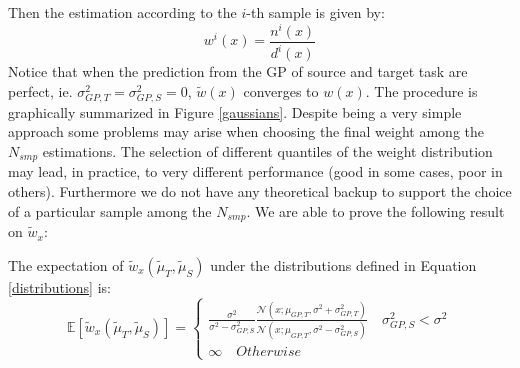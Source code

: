     Then the estimation according to the $i$-th sample is given by:
    \begin{equation}
      w^{i}(x) = \frac{n^{i}(x)}{d^{i}(x)}
    \end{equation}
    Notice that when the prediction from the GP of source and target task are perfect, ie. $\sigma_{GP,T}^{2} = \sigma_{GP,S}^{2} = 0$,
    $\tilde{w}(x)$ converges to $w(x)$.
    The procedure is graphically summarized in Figure \ref{gaussians}.\newline
    Despite being a very simple approach some problems may arise when choosing the final weight among the $N_{smp}$ estimations.
    The selection of different quantiles of the weight distribution may lead, in practice, to very different performance (good in some cases, poor in others). Furthermore
    we do not have any theoretical backup to support the choice of a particular sample among the $N_{smp}$.\newline
    We are able to prove the following result on $\tilde{w}_{x}$:
    \begin{lemma}
      The expectation of $\tilde{w}_{x}(\tilde{\mu}_{T}, \tilde{\mu}_{S})$ under the distributions defined in
      Equation \ref{distributions} is:
      \begin{equation}
        \mathbb{E}[\tilde{w}_{x}(\tilde{\mu}_{T}, \tilde{\mu}_{S})] =
        \begin{cases}
          \frac{\sigma^{2}}{\sigma^{2} - \sigma^{2}_{GP,S}} \frac{\mathcal{N}(x; \mu_{GP,T}, \sigma^{2} + \sigma^{2}_{GP,T})}{\mathcal{N}(x; \mu_{GP,T}, \sigma^{2} - \sigma^{2}_{GP,S})} \quad \sigma^{2}_{GP,S} < \sigma^{2} \\
          \infty \quad Otherwise
        \end{cases}
        \label{mean-weight}
      \end{equation}
    \end{lemma}
